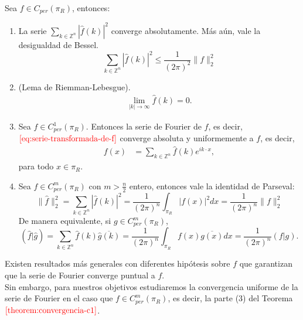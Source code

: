     \begin{theorem}\label{theorem:convergencia-c1}
      Sea $f\in C_{per}(\pi_R)$, entonces:
      \begin{enumerate}
        \item La serie $\sum_{k\in\mathbb{Z}^{n}}|\hat{f}(k)|^{2}$ converge absolutamente. Más aún, vale la desigualdad de Bessel.
          \begin{equation}
            \sum_{k\in\mathbb{Z}^{n}}|\hat{f}(k)|^2\leq \frac{1}{(2\pi)^2}\|f\|_{2}^{2} \label{eq:desigualdad-de-bessel}
          \end{equation}
        \item (Lema de Riemman-Lebesgue).\\
          \begin{align*}
            \lim_{|k| \rightarrow \infty}\hat{f}(k)=0.
          \end{align*}
        \item Sea $f\in C^{1}_{per}(\pi_R)$. Entonces la serie de Fourier de $f$, es decir, $\textcolor{red}{\ref{eq:serie-transformada-de-f}}$ converge absoluta y uniformemente a $f$, es decir,
          \begin{align*}
            f(x)&=\sum_{k\in\mathbb{Z}^{n}}\hat{f}(k)e^{ik\cdot x},
          \end{align*}
          para todo $x\in\pi_R$.
        \item Sea $f\in C^{m}_{per}(\pi_R)$ con $m>\frac{n}{2}$ entero, entonces vale la identidad de Parseval:
          \begin{equation}
            \|\hat{f}\|_{2}^{2}=\sum_{k\in\mathbb{Z}^{n}}|\hat{f}(k)|^2=\frac{1}{(2\pi)^{n}}\int_{\pi_R}|f(x)|^2dx=\frac{1}{(2\pi)^n}\|f\|_2^2\label{eq:identidad-de-parseval}  
          \end{equation}
          De manera equivalente, si $g\in C^{m}_{per}(\pi_R)$,
          \begin{equation}
            (\hat{f}|\hat{g})=\sum_{k\in\mathbb{Z}^{n}}\hat{f}(k)\overline{\hat{g}(k)}=\frac{1}{(2\pi)^n}\int_{\pi_R}f(x)\overline{g(x)}dx=\frac{1}{(2\pi)^n}(f|g).\label{eq:identidad-de-parseval-prod-int}
          \end{equation}
      \end{enumerate}
    \end{theorem}
    \begin{note}
      Existen resultados más generales con diferentes hipótesis sobre $f$ que garantizan que la serie de Fourier converge puntual a $f$.\\
      Sin embargo, para nuestros objetivos estudiaremos la convergencia uniforme de la serie de Fourier en el caso que $f \in C^{m}_{per}(\pi_R)$, es decir, la parte (3) del Teorema $\textcolor{red}{\ref{theorem:convergencia-c1}}$.
    \end{note}
